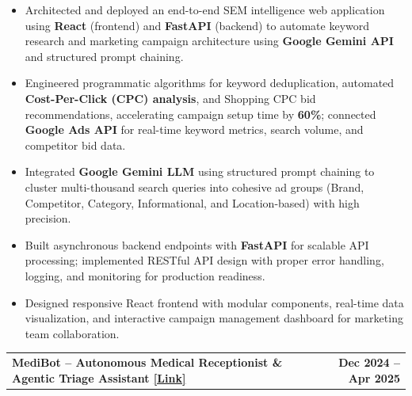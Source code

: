 \documentclass[10pt,a4paper]{article}
\makeatletter
\newcommand{\entry}[2]{%
    \noindent
    \begin{tabularx}{\linewidth}{@{}X r@{}}
        \textbf{#1} & \textbf{#2}
    \end{tabularx}
    \vspace{-2pt}
}
\makeatother
\begin{document}
\begin{itemize}

\item Architected and deployed an end-to-end SEM intelligence web application using \textbf{React} (frontend) and \textbf{FastAPI} (backend) to automate keyword research and marketing campaign architecture using \textbf{Google Gemini API} and structured prompt chaining.

\item Engineered programmatic algorithms for keyword deduplication, automated \textbf{Cost-Per-Click (CPC) analysis}, and Shopping CPC bid recommendations, accelerating campaign setup time by \textbf{60\%}; connected \textbf{Google Ads API} for real-time keyword metrics, search volume, and competitor bid data.

\item Integrated \textbf{Google Gemini LLM} using structured prompt chaining to cluster multi-thousand search queries into cohesive ad groups (Brand, Competitor, Category, Informational, and Location-based) with high precision.

\item Built asynchronous backend endpoints with \textbf{FastAPI} for scalable API processing; implemented RESTful API design with proper error handling, logging, and monitoring for production readiness.

\item Designed responsive React frontend with modular components, real-time data visualization, and interactive campaign management dashboard for marketing team collaboration.

\end{itemize}

\vspace{1pt}

\entry
{MediBot -- Autonomous Medical Receptionist \& Agentic Triage Assistant
\hspace{2pt}
\href{https://github.com/marideharshith21}
{\textcolor{linkblue}{[Link]}}}
{Dec 2024 -- Apr 2025}
\end{document}
